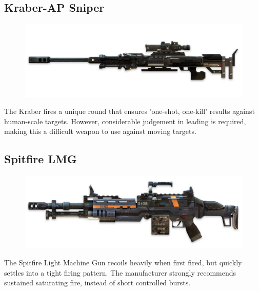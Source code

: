 \documentclass[9pt, openany]{extbook}
\begin{document}
\subsection{Kraber-AP Sniper}
\begin{figure}
\vspace*{-2em}
\includegraphics[width=\linewidth]{KraberAPSniper}
\end{figure}

The Kraber fires a unique round that ensures 'one-shot, one-kill' results against human-scale targets. However, considerable judgement in leading is required, making this a difficult weapon to use against moving targets.

\subsection{Spitfire LMG}
\begin{figure}
\vspace*{-2em}
\includegraphics[width=\linewidth]{SpitfireLMG}
\end{figure}

The Spitfire Light Machine Gun recoils heavily when first fired, but quickly settles into a tight firing pattern. The manufacturer strongly recommends sustained saturating fire, instead of short controlled bursts.
\end{document}
